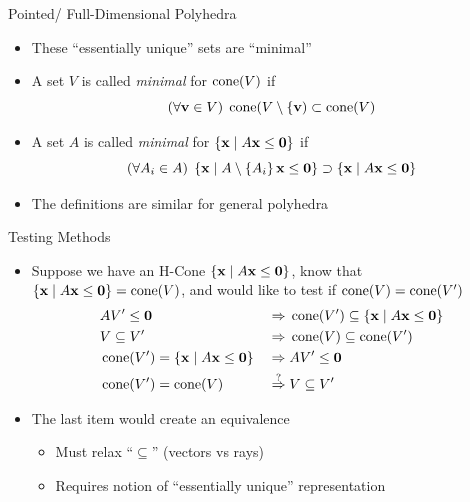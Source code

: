 \documentclass{beamer}
\begin{document}
\begin{frame}{Pointed/ Full-Dimensional Polyhedra}
\begin{itemize}
  \item<1-> These ``essentially unique'' sets are ``minimal''
  \item<2-> A set $V$ is called \textit{minimal} for $\operatorname{cone}(V)$ if
        \[ (\forall \mathbf{v}\in V)\; \operatorname{cone}(V\setminus\{\mathbf{v}) \subset \operatorname{cone}(V) \]
  \item<3-> A set $A$ is called \textit{minimal} for $\left\{\mathbf{x}\;|\; A\mathbf{x}\leq\mathbf{0}\right\}$ if
        \[ (\forall A_i \in A)\; \left\{\mathbf{x}\;|\; A\setminus\left\{A_i\right\}\mathbf{x}\leq\mathbf{0}\right\} \supset \left\{\mathbf{x}\;|\; A\mathbf{x}\leq\mathbf{0}\right\} \]
  \item<4-> The definitions are similar for general polyhedra
\end{itemize}
\end{frame}

\begin{frame}{Testing Methods}
\begin{itemize}
  \item<1-> Suppose we have an H-Cone $\left\{\mathbf{x}\;|\; A\mathbf{x}\leq\mathbf{0}\right\}$, know that $\left\{\mathbf{x}\;|\; A\mathbf{x}\leq\mathbf{0}\right\} = \operatorname{cone}(V)$, and would like to test if $\operatorname{cone}(V) = \operatorname{cone}(V')$
    \begin{alignat*}{2}
       & AV'\leq\mathbf{0} \;      & \Rightarrow & \; \operatorname{cone}(V') \subseteq \left\{\mathbf{x}\;|\; A\mathbf{x}\leq\mathbf{0}\right\}\\
       & V \subseteq V' \; & \Rightarrow & \; \operatorname{cone}(V) \subseteq \operatorname{cone}(V')\\
       & \operatorname{cone}(V') = \left\{\mathbf{x}\;|\; A\mathbf{x}\leq\mathbf{0}\right\} \;   & \Rightarrow & \; AV'\leq\mathbf{0} \\
       & \operatorname{cone}(V') = \operatorname{cone}(V)  \;& \overset{?}{\Rightarrow} & \; V \subseteq V'
    \end{alignat*}
  \item<2-> The last item would create an equivalence
  \begin{itemize}
    \item<3-> Must relax ``$\subseteq$'' (vectors vs rays)
    \item<4-> Requires notion of ``essentially unique'' representation
  \end{itemize}
\end{itemize}
\end{frame}
\end{document}
